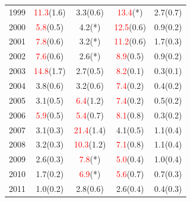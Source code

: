 \documentclass[paperwidth=58in,paperheight=47in,portrait]{baposter}
\begin{document}
\begin{poster}
{\begin{center}
{\begin{tabular}{r|c|c|c|c}
        1999 &  \textcolor{red}{11.3}(1.6) &   3.3(0.6) &       \textcolor{red}{13.4}(*) &   2.7(0.7) \\

        2000 &   \textcolor{red}{5.8}(0.5) &        4.2(*) &  \textcolor{red}{12.5}(0.6) &   0.9(0.2) \\

        2001 &   \textcolor{red}{7.8}(0.6) &        3.2(*) &  \textcolor{red}{11.2}(0.6) &   1.7(0.3) \\

        2002 &   \textcolor{red}{7.6}(0.6) &        2.6(*) &   \textcolor{red}{8.9}(0.5) &   0.9(0.2) \\

        2003 &  \textcolor{red}{14.8}(1.7) &   2.7(0.5) &   \textcolor{red}{8.2}(0.1) &   0.3(0.1) \\

        2004 &   3.8(0.6) &   3.2(0.6) &   \textcolor{red}{7.4}(0.2) &   0.4(0.2) \\

        2005 &   3.1(0.5) &   \textcolor{red}{6.4}(1.2) &   \textcolor{red}{7.4}(0.2) &   0.5(0.2) \\

        2006 &   \textcolor{red}{5.9}(0.5) &  \textcolor{red}{5.4}(0.7) &   \textcolor{red}{8.1}(0.8) &   0.3(0.2) \\

        2007 &   3.1(0.3) &  \textcolor{red}{21.4}(1.4) &   4.1(0.5) &   1.1(0.4) \\

        2008 &   3.2(0.3) &  \textcolor{red}{10.3}(1.2) &   \textcolor{red}{7.1}(0.8) &   1.1(0.4) \\

        2009 &   2.6(0.3) &        \textcolor{red}{7.8}(*) &   \textcolor{red}{5.0}(0.4) &   1.0(0.4) \\

        2010 &   1.7(0.2) &        \textcolor{red}{6.9}(*) &   \textcolor{red}{5.6}(0.7) &   0.7(0.3) \\

        2011 &   1.0(0.2) &   2.8(0.6) &   2.6(0.4) &   0.4(0.3) \\

\end{tabular}}\end{center}

\begin{multicols}{2}    %


\end{multicols}}
\end{poster}
\end{document}
